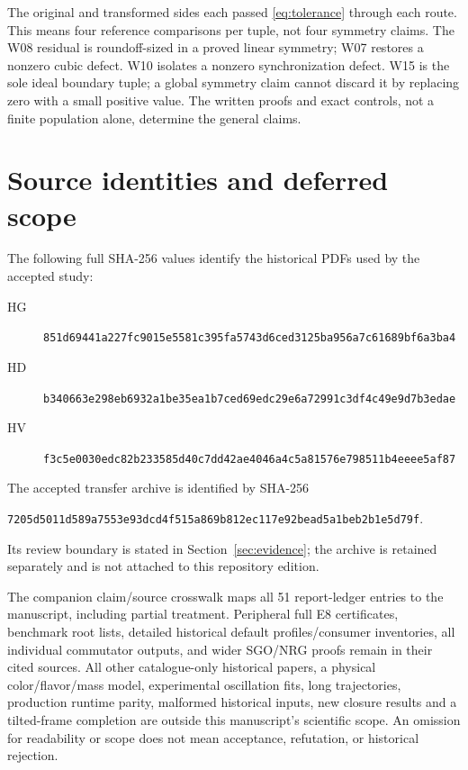 \documentclass[11pt,a4paper]{article}
\numberwithin{equation}{section}
\newcommand{\secref}[1]{Section~\ref{#1}}
\begin{document}
The original and transformed sides each passed \eqref{eq:tolerance} through each route. This means four reference comparisons per tuple, not four symmetry claims. The W08 residual is roundoff-sized in a proved linear symmetry; W07 restores a nonzero cubic defect. W10 isolates a nonzero synchronization defect. W15 is the sole ideal boundary tuple; a global symmetry claim cannot discard it by replacing zero with a small positive value. The written proofs and exact controls, not a finite population alone, determine the general claims.

\section{Source identities and deferred scope}\label{app:identity}
The following full SHA-256 values identify the historical PDFs used by the accepted study:
\begin{description}
\item[HG] \hfill\break\footnotesize\nolinkurl{851d69441a227fc9015e5581c395fa5743d6ced3125ba956a7c61689bf6a3ba4}
\item[HD] \hfill\break\footnotesize\nolinkurl{b340663e298eb6932a1be35ea1b7ced69edc29e6a72991c3df4c49e9d7b3edae}
\item[HV] \hfill\break\footnotesize\nolinkurl{f3c5e0030edc82b233585d40c7dd42ae4046a4c5a81576e798511b4eeee5af87}
\end{description}
The accepted transfer archive is identified by SHA-256
\begin{center}\footnotesize\nolinkurl{7205d5011d589a7553e93dcd4f515a869b812ec117e92bead5a1beb2b1e5d79f}.\end{center}
Its review boundary is stated in \secref{sec:evidence}; the archive is retained separately and is not attached to this repository edition.

The companion claim/source crosswalk maps all 51 report-ledger entries to the manuscript, including partial treatment. Peripheral full E8 certificates, benchmark root lists, detailed historical default profiles/consumer inventories, all individual commutator outputs, and wider SGO/NRG proofs remain in their cited sources. All other catalogue-only historical papers, a physical color/flavor/mass model, experimental oscillation fits, long trajectories, production runtime parity, malformed historical inputs, new closure results and a tilted-frame completion are outside this manuscript's scientific scope. An omission for readability or scope does not mean acceptance, refutation, or historical rejection.
\end{document}

